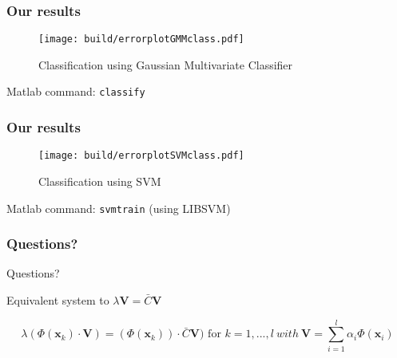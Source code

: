 \documentclass{beamer}
\begin{document}
\begin{frame}
\frametitle{Our results}

\begin{figure}
\centering
\caption{Classification using Gaussian Multivariate Classifier}
\texttt{[image: build/errorplotGMMclass.pdf]}
\end{figure}

Matlab command: \texttt{classify}
\end{frame}

\begin{frame}
\frametitle{Our results}

\begin{figure}
\centering
\caption{Classification using SVM}
\texttt{[image: build/errorplotSVMclass.pdf]}
\end{figure}

Matlab command: \texttt{svmtrain} (using LIBSVM)
\end{frame}




\begin{frame}
\frametitle{Questions?}
\begin{center}
\huge{Questions?}
\end{center}
\end{frame}


\begin{frame}
Equivalent system to $\lambda\textbf{V}=\bar{C}\textbf{V}$

    \begin{equation} \label{eq:eq_system}
        \lambda (\Phi(\textbf{x}_k) \cdot \textbf{V}) = (\Phi(\textbf{x}_k)) \cdot \bar{C} \textbf{V})\text{ for }k = 1,...,l~with~\textbf{V} = \sum\limits_{i=1}^{l} \alpha_i \Phi(\textbf{x}_i)
    \end{equation}

\end{frame}
\end{document}
